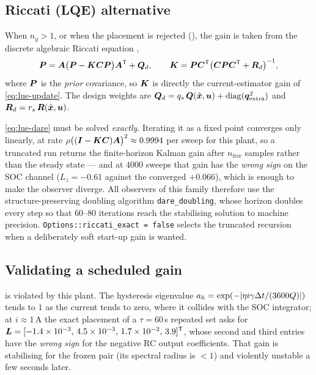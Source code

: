 \subsection{Riccati (LQE) alternative}
When $n_y > 1$, or when the placement is rejected (), the gain is taken
from the discrete algebraic Riccati equation \cite[Sec.~4.4]{andersonmoore1979},
\begin{equation}
\bm{P} = \bm{A}\big(\bm{P} - \bm{K}\bm{C}\bm{P}\big)\bm{A}^{\mathsf{T}} + \bm{Q}_d , \qquad
\bm{K} = \bm{P}\bm{C}^{\mathsf{T}}\big(\bm{C}\bm{P}\bm{C}^{\mathsf{T}} + \bm{R}_d\big)^{-1} ,
\label{eq:lue-dare}
\end{equation}
where $\bm{P}$ is the \emph{prior} covariance, so $\bm{K}$ is directly the current-estimator gain of
\eqref{eq:lue-update}.  The design weights are
$\bm{Q}_d = q_s\,\bm{Q}(\hat{\bm{x}},\bm{u}) + \operatorname{diag}(\bm{q}_{\text{extra}}^2)$ and
$\bm{R}_d = r_s\,\bm{R}(\hat{\bm{x}},\bm{u})$.

\eqref{eq:lue-dare} must be solved \emph{exactly}.  Iterating it as a fixed point converges only
linearly, at rate $\rho\big((\bm{I}-\bm{K}\bm{C})\bm{A}\big)^2 \approx 0.9994$ per sweep for this plant, so a
truncated run returns the finite-horizon Kalman gain after $n_{\text{iter}}$ samples rather than
the steady state --- and at $4000$ sweeps that gain has the \emph{wrong sign} on the SOC channel
($L_z = -0.61$ against the converged $+0.066$), which is enough to make the observer diverge.  All
observers of this family therefore use the structure-preserving doubling algorithm
\texttt{dare\_doubling}, whose horizon doubles every step so that $60$--$80$ iterations reach the
stabilising solution to machine precision.  \texttt{Options::riccati\_exact = false} selects the
truncated recursion when a deliberately soft start-up gain is wanted.

\subsection{Validating a scheduled gain}
\label{sec:lue-schedule}
 is violated by this plant.  The hysteresis eigenvalue
$a_h = \exp(-|\eta i \gamma \Delta t/(3600 Q)|)$ tends to $1$ as the current tends to zero, where it
collides with the SOC integrator; at $i\approx 1$\,A the exact placement of a $\tau = 60$\,s
repeated set asks for $\bm{L} = [-1.4\times10^{-3},\,4.5\times10^{-3},\,1.7\times10^{-2},\,3.9]^{\mathsf{T}}$,
whose second and third entries have the \emph{wrong sign} for the negative RC output
coefficients.  That gain is stabilising for the frozen pair (its spectral radius is $<1$) and
violently unstable a few seconds later.

